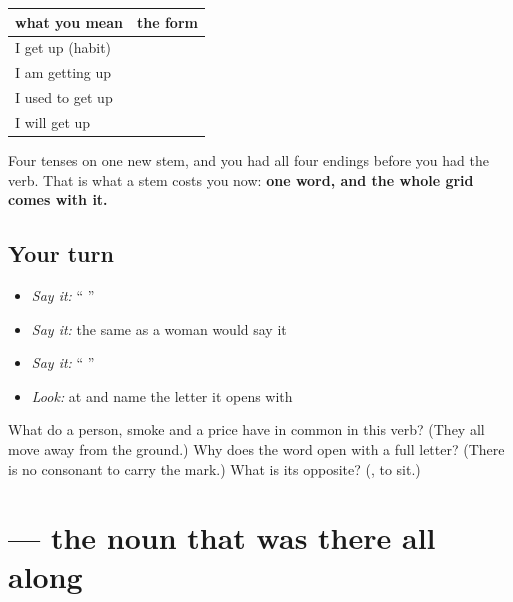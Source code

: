 \begin{grammarlens}[title={Grammar Lens: it takes the endings you already have}]
\noindent
\begin{tabularx}{\linewidth}{@{}>{\raggedright\arraybackslash}X>{\raggedright\arraybackslash}X@{}}
\toprule
\textbf{what you mean} & \textbf{the form} \\
\midrule
I get up (habit) & \hi{उठता} \hi{हूँ} \\
I am getting up & \hi{उठ} \hi{रहा} \hi{हूँ} \\
I used to get up & \hi{उठता} \hi{था} \\
I will get up & \hi{उठूँगा} \\
\bottomrule
\end{tabularx}

Four tenses on one new stem, and you had all four endings before you had the verb. That is what a stem costs you now: \textbf{one word, and the whole grid comes with it.}
\end{grammarlens}

\subsection*{Your turn}
\begin{itemize}
\raggedright
  \item \emph{Say it:} \textquotedblleft{}   \textquotedblright{}
  \item \emph{Say it:} the same as a woman would say it
  \item \emph{Say it:} \textquotedblleft{}     \textquotedblright{}
  \item \emph{Look:} at  and name the letter it opens with
\end{itemize}

\begin{tcolorbox}[breakable,colback=teal!4,colframe=teal!35!black,title={Before you move on}]
What do a person, smoke and a price have in common in this verb? (They all move away from the ground.) Why does the word open with a full letter? (There is no consonant to carry the mark.) What is its opposite? (\textbf{}, to sit.)
\end{tcolorbox}
\section[\texorpdfstring{\hi{काम} (kām)}{काम (kām)}]{ — the noun that was there all along}

